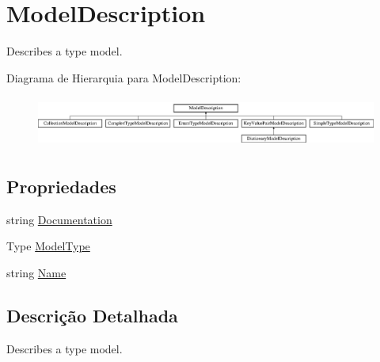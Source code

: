 \hypertarget{classApi3Layers_1_1Areas_1_1HelpPage_1_1ModelDescriptions_1_1ModelDescription}{}\section{Model\+Description}
\label{classApi3Layers_1_1Areas_1_1HelpPage_1_1ModelDescriptions_1_1ModelDescription}


Describes a type model.  


Diagrama de Hierarquia para Model\+Description\+:\begin{figure}[H]
\begin{center}
\leavevmode
\includegraphics[height=1.705584cm]{classApi3Layers_1_1Areas_1_1HelpPage_1_1ModelDescriptions_1_1ModelDescription}
\end{center}
\end{figure}
\subsection*{Propriedades}
\begin{DoxyCompactItemize}
\item 
string \hyperlink{classApi3Layers_1_1Areas_1_1HelpPage_1_1ModelDescriptions_1_1ModelDescription_a239e2715951fcab2d9b263ef6acfa899}{Documentation}
\item 
Type \hyperlink{classApi3Layers_1_1Areas_1_1HelpPage_1_1ModelDescriptions_1_1ModelDescription_ab4e6bdc2197fcee901bb151c8d9fa3c2}{Model\+Type}
\item 
string \hyperlink{classApi3Layers_1_1Areas_1_1HelpPage_1_1ModelDescriptions_1_1ModelDescription_a7ee9065718e6628dc7791b756fa6c0f9}{Name}
\end{DoxyCompactItemize}


\subsection{Descrição Detalhada}
Describes a type model. 



